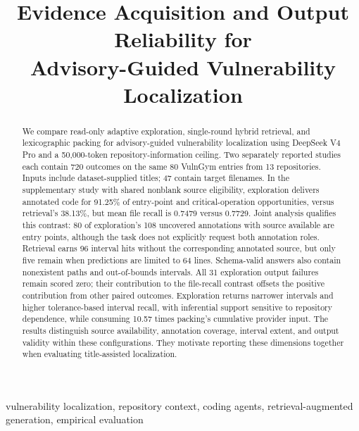 \documentclass[conference,10pt,letterpaper]{IEEEtran}
\title{Evidence Acquisition and Output Reliability for\\Advisory-Guided Vulnerability Localization}
\author{\IEEEauthorblockN{Authors to be specified}}
\begin{document}
\maketitle
\begin{abstract}
We compare read-only adaptive exploration, single-round hybrid retrieval, and lexicographic packing for advisory-guided vulnerability localization using DeepSeek V4 Pro and a 50,000-token repository-information ceiling. Two separately reported studies each contain 720 outcomes on the same 80 VulnGym entries from 13 repositories. Inputs include dataset-supplied titles; 47 contain target filenames. In the supplementary study with shared nonblank source eligibility, exploration delivers annotated code for 91.25\% of entry-point and critical-operation opportunities, versus retrieval's 38.13\%, but mean file recall is 0.7479 versus 0.7729. Joint analysis qualifies this contrast: 80 of exploration's 108 uncovered annotations with source available are entry points, although the task does not explicitly request both annotation roles. Retrieval earns 96 interval hits without the corresponding annotated source, but only five remain when predictions are limited to 64 lines. Schema-valid answers also contain nonexistent paths and out-of-bounds intervals. All 31 exploration output failures remain scored zero; their contribution to the file-recall contrast offsets the positive contribution from other paired outcomes. Exploration returns narrower intervals and higher tolerance-based interval recall, with inferential support sensitive to repository dependence, while consuming 10.57 times packing's cumulative provider input. The results distinguish source availability, annotation coverage, interval extent, and output validity within these configurations. They motivate reporting these dimensions together when evaluating title-assisted localization.
\end{abstract}
\begin{IEEEkeywords}
vulnerability localization, repository context, coding agents, retrieval-augmented generation, empirical evaluation
\end{IEEEkeywords}










\appendices
\end{document}
